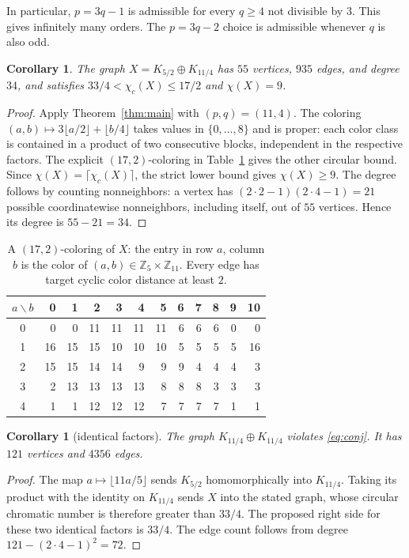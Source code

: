 \documentclass[11pt]{article}
\newtheorem{corollary}[theorem]{Corollary}
\newcommand{\Z}{\mathbb Z}
\newcommand{\cc}{\chi_c}
\begin{document}
In particular, $p=3q-1$ is admissible for every $q\geq4$ not divisible
by $3$.  This gives infinitely many orders.  The $p=3q-2$ choice is
admissible whenever $q$ is also odd.

\begin{corollary}\label{cor:55}
The graph $X=K_{5/2}\oplus K_{11/4}$ has $55$ vertices, $935$ edges, and
degree $34$, and satisfies $33/4<\cc(X)\leq17/2$ and $\chi(X)=9$.
\end{corollary}
\begin{proof}
Apply Theorem~\ref{thm:main} with $(p,q)=(11,4)$.  The coloring
$(a,b)\mapsto3\lfloor a/2\rfloor+\lfloor b/4\rfloor$ takes values in
$\{0,\ldots,8\}$ and is proper: each color class is contained in a
product of two consecutive blocks, independent in the respective
factors.  The explicit $(17,2)$-coloring in Table~\ref{tab:witness}
gives the other circular bound.  Since $\chi(X)=\lceil\cc(X)\rceil$, the strict lower bound gives
$\chi(X)\geq9$.  The degree follows by counting nonneighbors: a vertex
has $(2\cdot2-1)(2\cdot4-1)=21$ possible coordinatewise nonneighbors,
including itself, out of $55$ vertices.  Hence its degree is $55-21=34$.
\end{proof}

\begin{table}[ht]
\centering\small
\begin{tabular}{c*{11}{r}}
\toprule
 $a\backslash b$ & 0&1&2&3&4&5&6&7&8&9&10\\\midrule
 0&0&0&11&11&11&11&6&6&6&0&0\\
 1&16&15&15&10&10&10&5&5&5&5&16\\
 2&15&15&14&14&9&9&9&4&4&4&3\\
 3&2&13&13&13&13&8&8&8&3&3&3\\
 4&1&1&12&12&12&7&7&7&7&1&1
\\
\bottomrule
\end{tabular}
\caption{A $(17,2)$-coloring of $X$: the entry in row $a$, column $b$
is the color of $(a,b)\in\Z_5\times\Z_{11}$.  Every edge has target
cyclic color distance at least $2$.}\label{tab:witness}
\end{table}

\begin{corollary}[identical factors]\label{cor:diagonal}
The graph $K_{11/4}\oplus K_{11/4}$ violates \eqref{eq:conj}.
It has $121$ vertices and $4356$ edges.
\end{corollary}
\begin{proof}
The map $a\mapsto\lfloor11a/5\rfloor$ sends $K_{5/2}$
homomorphically into $K_{11/4}$.  Taking its product with the identity
on $K_{11/4}$ sends $X$ into the stated graph, whose circular chromatic
number is therefore greater than $33/4$.  The proposed right side for
these two identical factors is $33/4$.  The edge count follows from
degree $121-(2\cdot4-1)^2=72$.
\end{proof}
\end{document}
